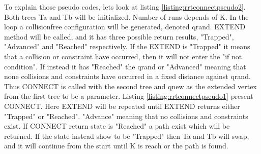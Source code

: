 To explain those pseudo codes, lets look at listing \ref{listing:rrtconnectpseudo2}. Both trees Ta and Tb will be initialized. Number of runs depends of K. In the loop a collisionfree configuration will be generated, denoted qrand. EXTEND method will be called, and it has three possible return results, "Trapped", "Advanced" and "Reached" respectively. If the EXTEND is "Trapped" it means that a collision or constraint have occurred, then it will not enter the "if not condition". If instead it has "Reached" the qrand or "Advanced" meaning that none collisions and constraints have occurred in a fixed distance against qrand. Thus CONNECT is called with the second tree and qnew as the extended vertex from the first tree to be a parameter. Listing \ref{listing:rrtconnectpseudo1} present CONNECT. Here EXTEND will be repeated until EXTEND returns either "Trapped" or "Reached". "Advance" meaning that no collisions and constraints exist. If CONNECT return state is "Reached" a path exist which will be returned. If the state instead show to be "Trapped" then Ta and Tb will swap, and it will continue from the start until K is reach or the path is found.